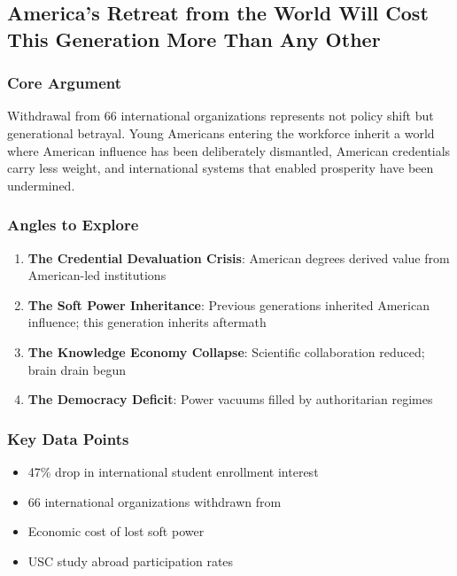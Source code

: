 \documentclass[11pt,letterpaper]{article}
\begin{document}
\newpage
\subsection{America's Retreat from the World Will Cost This Generation More Than Any Other}

\subsubsection*{Core Argument}
Withdrawal from 66 international organizations represents not policy shift but generational betrayal. Young Americans entering the workforce inherit a world where American influence has been deliberately dismantled, American credentials carry less weight, and international systems that enabled prosperity have been undermined.

\subsubsection*{Angles to Explore}
\begin{enumerate}[noitemsep]
    \item \textbf{The Credential Devaluation Crisis}: American degrees derived value from American-led institutions
    \item \textbf{The Soft Power Inheritance}: Previous generations inherited American influence; this generation inherits aftermath
    \item \textbf{The Knowledge Economy Collapse}: Scientific collaboration reduced; brain drain begun
    \item \textbf{The Democracy Deficit}: Power vacuums filled by authoritarian regimes
\end{enumerate}

\subsubsection*{Key Data Points}
\begin{itemize}[noitemsep]
    \item 47\% drop in international student enrollment interest
    \item 66 international organizations withdrawn from
    \item Economic cost of lost soft power
    \item USC study abroad participation rates
\end{itemize}
\end{document}
